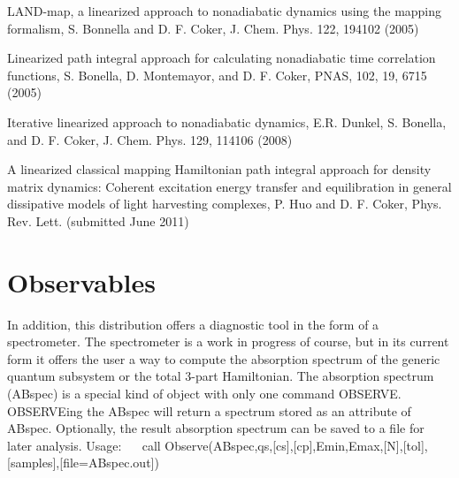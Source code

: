 \begin{DoxyEnumerate}
\item L\+A\+N\+D-\/map, a linearized approach to nonadiabatic dynamics using the mapping formalism, S. Bonnella and D. F. Coker, J. Chem. Phys. 122, 194102 (2005)~\newline

\item Linearized path integral approach for calculating nonadiabatic time correlation functions, S. Bonella, D. Montemayor, and D. F. Coker, P\+N\+AS, 102, 19, 6715 (2005)~\newline

\item Iterative linearized approach to nonadiabatic dynamics, E.\+R. Dunkel, S. Bonella, and D. F. Coker, J. Chem. Phys. 129, 114106 (2008)~\newline

\item A linearized classical mapping Hamiltonian path integral approach for density matrix dynamics\+: Coherent excitation energy transfer and equilibration in general dissipative models of light harvesting complexes, P. Huo and D. F. Coker, Phys. Rev. Lett. (submitted June 2011)~\newline
~\newline

\end{DoxyEnumerate}\hypertarget{_interface_Observables}{}\section{Observables}\label{_interface_Observables}
In addition, this distribution offers a diagnostic tool in the form of a spectrometer. The spectrometer is a work in progress of course, but in its current form it offers the user a way to compute the absorption spectrum of the generic quantum subsystem or the total 3-\/part Hamiltonian. The absorption spectrum (A\+Bspec) is a special kind of object with only one command O\+B\+S\+E\+R\+VE. O\+B\+S\+E\+R\+V\+Eing the A\+Bspec will return a spectrum stored as an attribute of A\+Bspec. Optionally, the result absorption spectrum can be saved to a file for later analysis. Usage\+:~\newline
~\newline
 call Observe(A\+Bspec,qs,\mbox{[}cs\mbox{]},\mbox{[}cp\mbox{]},Emin,Emax,\mbox{[}N\mbox{]},\mbox{[}tol\mbox{]},\mbox{[}samples\mbox{]},\mbox{[}file=\textquotesingle{}A\+Bspec.\+out\textquotesingle{}\mbox{]})~\newline
